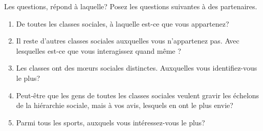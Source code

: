 \begin{frame}{Les questions, répond à laquelle?}
  Posez les questions suivantes à des partenaires.
  \begin{enumerate}
    \item De toutes les classes sociales, à laquelle est-ce que vous appartenez?
    \item Il reste d'autres classes sociales auxquelles vous n'appartenez pas. Avec lesquelles est-ce que vous interagissez quand même ?
    \item Les classes ont des mœurs sociales distinctes. Auxquelles vous identifiez-vous le plus?
    \item Peut-être que les gens de toutes les classes sociales veulent gravir les échelons de la hiérarchie sociale, mais à vos avis, lesquels en ont le plus envie?
    \item Parmi tous les sports, auxquels vous intéressez-vous le plus?
  \end{enumerate}
\end{frame}